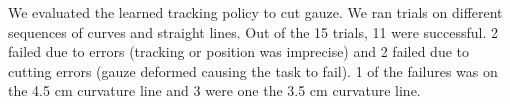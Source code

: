 We evaluated the learned tracking policy to cut gauze.
We ran trials on different sequences of curves and straight lines. 
Out of the 15 trials, 11 were successful.
2 failed due to \hirl errors (tracking or position was imprecise) and 2 failed due to cutting errors (gauze deformed causing the task to fail).
1 of the failures was on the 4.5 cm curvature line and 3 were one the 3.5 cm curvature line.




